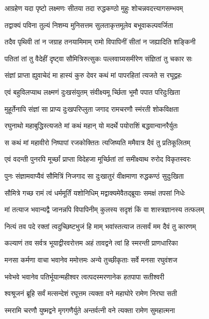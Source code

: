 \twolineshloka
{आग्रहेण यदा पृष्टो लक्ष्मणः सीतया तदा}
{रुद्धकण्ठो मुहुः शोचन्नवदत्त्यागसम्भवम्}%

\twolineshloka
{तद्वाक्यं पविना तुल्यं निशम्य मुनिसत्तम}
{सुलताकृत्तमूलेव बभूवाकल्पवर्जिता}%

\twolineshloka
{तदैव पृथिवी तां न जग्राह तनयामिमाम्}
{रामो विपापिनीं सीतां न जह्यादिति शङ्किनी}%

\twolineshloka
{पतितां तां तु वैदेहीं दृष्ट्वा सौमित्रिरुत्सुकः}
{पल्लवाग्र्यसमीरेण संज्ञितां तु चकार सः}%

\twolineshloka
{संज्ञां प्राप्ता ह्युवाचेदं मा हास्यं कुरु देवर}
{कथं मां पापरहितां त्यजते स रघूद्वहः}%

\twolineshloka
{एवं बहुविलप्याथ लक्ष्मणं दुःखसंयुतम्}
{संवीक्ष्यमू र्च्छिता भूमौ पपात परिदुःखिता}%

\twolineshloka
{मुहूर्तेनापि संज्ञां सा प्राप्य दुःखपरिप्लुता}
{जगाद रामचरणौ स्मंरती शोकविक्षता}%

\twolineshloka
{रघुनाथो महाबुद्धिस्त्यजते मां कथं महान्}
{यो मदर्थे पयोराशिं बद्धवान्वानरैर्युतः}%

\twolineshloka
{स कथं मां महावीरो निष्पापां रजकोक्तितः}
{त्यजिष्यति ममैवात्र दैवं तु प्रतिकूलितम्}%

\twolineshloka
{एवं वदन्ती पुनरपि मूर्च्छां प्राप्ता विदेहजा}
{मूर्च्छितां तां समीक्ष्याथ रुरोद विकृतस्वरः}%

\twolineshloka
{पुनः संज्ञामवाप्यैवं सौमित्रिं निजगाद सा}
{दुःखातुरं वीक्षमाणा रुद्धकण्ठं सुदुःखिता}%

\twolineshloka
{सौमित्रे गच्छ रामं त्वं धर्ममूर्तिं यशोनिधिम्}
{मद्वाक्यमेवैतद्ब्रूयाः समक्षं तपसां निधेः}%

\twolineshloka
{मां तत्याज भवान्यद्वै जानन्नपि विपापिनीम्}
{कुलस्य सदृशं किं वा शास्त्रज्ञानस्य तत्फलम्}%

\twolineshloka
{नित्यं तव पदे रक्तां त्वदुच्छिष्टभुजं हि माम्}
{भवांस्तत्याज तत्सर्वं मम दैवं तु कारणम्}%

\twolineshloka
{कल्याणं तव सर्वत्र भूयाद्वीरवरोत्तम}
{अहं तावद्वने त्वां हि स्मरन्ती प्राणधारिका}%

\twolineshloka
{मनसा कर्मणा वाचा भवानेव ममोत्तमः}
{अन्ये तुच्छीकृताः सर्वे मनसा रघुवंशज}%

\twolineshloka
{भवेभवे भवानेव पतिर्भूयान्महीश्वर}
{त्वत्पदस्मरणानेक हतपापा सतीश्वरी}%

\twolineshloka
{श्वश्रूजनं ब्रूहि सर्वं मत्सन्देशं रघूत्तम}
{त्यक्ता वने महाघोरे रामेण निरघा सती}%

\twolineshloka
{स्मरामि चरणौ युष्मद्वने मृगगणैर्युते}
{अन्तर्वत्नी वने त्यक्ता रामेण सुमहात्मना}%

